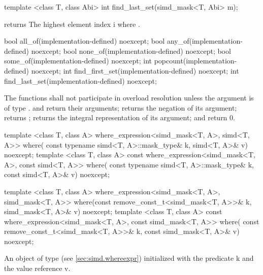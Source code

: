 \begin{itemdecl}
template <class T, class Abi> int find_last_set(simd_mask<T, Abi> m);
\end{itemdecl}
\begin{itemdescr}
  \pnum\requires {} returns \true
  \pnum\returns The highest element index \code i where .
\end{itemdescr}

\begin{itemdecl}
bool  all_of(implementation-defined) noexcept;
bool  any_of(implementation-defined) noexcept;
bool none_of(implementation-defined) noexcept;
bool some_of(implementation-defined) noexcept;
int popcount(implementation-defined) noexcept;
int find_first_set(implementation-defined) noexcept;
int find_last_set(implementation-defined) noexcept;
\end{itemdecl}
\begin{itemdescr}
  \pnum\remarks The functions shall not participate in overload resolution unless the argument is of type \bool.
  \pnum\returns {} and  return their arguments;  returns the negation of its argument;  returns \false;  returns the integral representation of its argument;  and  return 0.
\end{itemdescr}

\begin{itemdecl}
template <class T, class A>
where_expression<simd_mask<T, A>, simd<T, A>> where(
    const typename simd<T, A>::mask_type& k, simd<T, A>& v) noexcept;
template <class T, class A>
const where_expression<simd_mask<T, A>, const simd<T, A>> where(
    const typename simd<T, A>::mask_type& k, const simd<T, A>& v) noexcept;

template <class T, class A>
where_expression<simd_mask<T, A>, simd_mask<T, A>> where(const remove_const_t<simd_mask<T, A>>& k,
                                               simd_mask<T, A>& v) noexcept;
template <class T, class A>
const where_expression<simd_mask<T, A>, const simd_mask<T, A>> where(
    const remove_const_t<simd_mask<T, A>>& k, const simd_mask<T, A>& v) noexcept;
\end{itemdecl}
\begin{itemdescr}
  \pnum\returns An object of type  (see \ref{sec:simd.whereexpr}) initialized with the predicate \code k and the value reference \code v.
\end{itemdescr}

